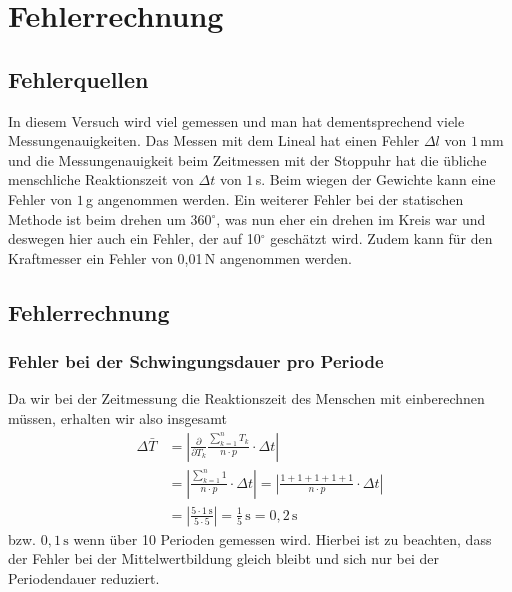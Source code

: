 \documentclass[fontsize=12pt]{scrartcl}
\begin{document}
\section{Fehlerrechnung}

\subsection{Fehlerquellen}

In diesem Versuch wird viel gemessen und man hat dementsprechend viele Messungenauigkeiten.
Das Messen mit dem Lineal hat einen Fehler $\Delta l$ von $1$\,mm und die Messungenauigkeit beim Zeitmessen mit der Stoppuhr hat die übliche 
menschliche Reaktionszeit von $\Delta t$ von $1$\,s. Beim wiegen der Gewichte kann eine Fehler von $1$\,g angenommen werden. 
Ein weiterer Fehler bei der statischen Methode ist beim drehen um 360$^{\circ}$, was nun eher ein drehen im Kreis war und deswegen hier auch ein Fehler, 
der auf 10$^{\circ}$ geschätzt wird. Zudem kann für den Kraftmesser ein Fehler von 0,01\,N angenommen werden.

\subsection{Fehlerrechnung}

\subsubsection{Fehler bei der Schwingungsdauer pro Periode}
Da wir bei der Zeitmessung die Reaktionszeit des Menschen mit einberechnen müssen, erhalten wir also insgesamt 
\begin{align*}
\Delta \bar{T}&=\left \vert\frac{\partial}{\partial T_k} \frac{\sum\limits_{k=1}^n T_k}{n \cdot p} \cdot \Delta t \right \vert\\
&=\left \vert  \frac{\sum\limits_{k=1}^n 1 }{n \cdot p} \cdot \Delta t \right \vert =\left \vert  \frac{1+1+1+1+1}{n \cdot p} \cdot \Delta t \right \vert\\
&=\left \vert \frac{5\cdot 1\,\text{s}}{5 \cdot 5}\right \vert=\frac{1}{5}\,\text{s}=0,2\,\text{s}
\end{align*}
bzw. $0,1\,\text{s}$ wenn über 10 Perioden gemessen wird.
Hierbei ist zu beachten, dass der Fehler bei der Mittelwertbildung gleich bleibt und sich nur bei der Periodendauer reduziert.
\end{document}
